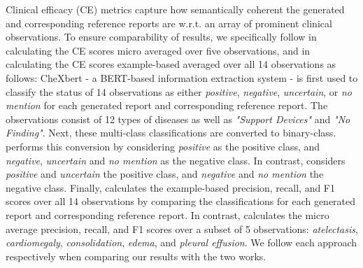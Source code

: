 \documentclass[10pt,twocolumn,letterpaper]{article}
\begin{document}
Clinical efficacy (CE) metrics capture how semantically coherent the generated and corresponding reference reports are w.r.t. an array of prominent clinical observations. To ensure comparability of results, we specifically follow \cite{miura2021improving} in calculating the CE scores micro averaged over five observations, and \cite{nicolson2022improving} in calculating the CE scores example-based averaged over all 14 observations as follows: CheXbert \cite{smit2020combining} - a BERT\cite{devlin2019bert}-based information extraction system - is first used to classify the status of 14 observations as either \emph{positive}, \emph{negative}, \emph{uncertain}, or \emph{no mention} for each generated report and corresponding reference report. The observations consist of 12 types of diseases as well as \emph{"Support Devices"} and \emph{"No Finding"}. Next, these multi-class classifications are converted to binary-class. \cite{nicolson2022improving} performs this conversion by considering \emph{positive} as the positive class, and \emph{negative}, \emph{uncertain} and \emph{no mention} as the negative class. In contrast, \cite{miura2021improving} considers \emph{positive} and \emph{uncertain} the positive class, and \emph{negative} and \emph{no mention} the negative class. Finally, \cite{nicolson2022improving} calculates the example-based precision, recall, and F1 scores over all 14 observations by comparing the classifications for each generated report and corresponding reference report. In contrast, \cite{miura2021improving} calculates the micro average precision, recall, and F1 scores over a subset of 5 observations: \emph{atelectasis}, \emph{cardiomegaly}, \emph{consolidation}, \emph{edema}, and \emph{pleural effusion}. We follow each approach respectively when comparing our results with the two works.
\end{document}
